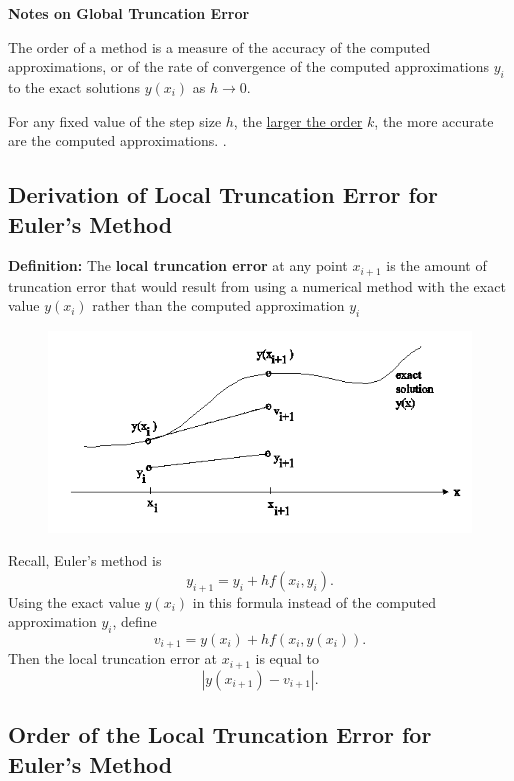 \documentclass [titlepage,12pt,letter] {article}
\begin{document}
{\bf Notes on Global Truncation Error}

The order of a method is a measure of the accuracy of the computed approximations, or of the rate of convergence of the computed approximations $y_i$ to the exact solutions $y(x_i)$ as $h \rightarrow 0$.

\vspace{\baselineskip}

For any fixed value of the step size $h$, the \underline{larger the order} $k$, the more accurate are the computed approximations.
			 .
\subsection{Derivation of Local Truncation Error for Euler's Method}

{\bf Definition:} The {\bf local truncation error} at any point $x_{i+1}$ is the amount of truncation error that would result from using a numerical method with the exact value $y(x_i)$ rather than the computed approximation $y_i$

\begin{figure}[h] 
  \centering
  \includegraphics[scale=0.65]{local_trunc}
  \label{fig:local_trunc}
\end{figure}

Recall, Euler’s method is
\[
y_{i+1}=y_i+hf(x_i,y_i).
\]
Using the exact value $y(x_i)$ in this formula instead of the computed approximation $y_i$, define
\begin{equation}
v_{i+1}=y(x_i)+hf(x_i,y(x_i)).
\end{equation}
Then the local truncation error at $x_{i+1}$ is equal to
\[
|y(x_{i+1})-v_{i+1}|.
\]

\subsection{Order of the Local Truncation Error for Euler's Method}
\end{document}
